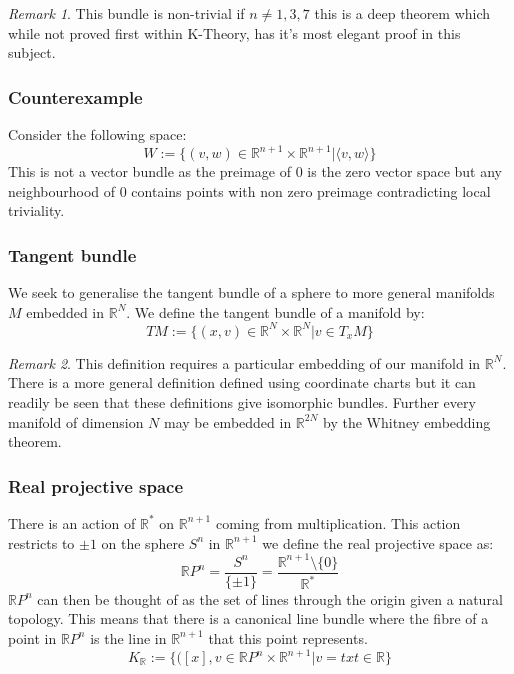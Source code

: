 \documentclass[a4paper,10pt]{article}
\theoremstyle{plain}%
\theoremstyle{definition}
\theoremstyle{remark}
\newtheorem{rem}{Remark}
\newcommand{\RR}{\mathbb{R}}
\begin{document}
\begin{rem}
 This bundle is non-trivial if $n\neq 1,3,7$ this is a deep theorem which while not proved first within 
K-Theory, has it's most elegant proof in this subject.
\end{rem}


\subsubsection{Counterexample}

Consider the following space:
$$W:=\{ (v,w) \in \RR^{n+1}\times \RR^{n+1} | \langle v,w \rangle \}$$
This is not a vector bundle as the preimage of $0$ is the zero vector space but any neighbourhood of $0$ 
contains points with non zero preimage contradicting local triviality.

\subsubsection{Tangent bundle}

We seek to generalise the tangent bundle of a sphere to more general manifolds $M$ embedded in $\RR^N$.
We define the tangent bundle of a manifold by:
$$TM:=\{ (x,v)\in \RR^N\times\RR^N | v\in T_xM \}$$

\begin{rem}
 This definition requires a particular embedding of our manifold in $\RR^N$. There is a more general definition
defined using coordinate charts but it can readily be seen that these definitions give isomorphic bundles. Further 
every manifold of dimension $N$ may be embedded in $\RR^{2N}$ by the Whitney embedding theorem. 
\end{rem}


\subsubsection{Real projective space}

There is an action of $\RR^\ast$ on $\RR^{n+1}$ coming from multiplication. This action restricts to $\pm 1$ on 
the sphere $S^n$ in $\RR^{n+1}$ we define the real projective space as:
$$\RR P^n = \frac{S^n}{\{\pm 1\}} = \frac{\RR^{n+1}\setminus\{0\}}{\RR^\ast}$$
$\RR P^n$ can then be thought of as the set of lines through the origin given a natural topology. This means 
that there is a canonical line bundle where the fibre of a point in $\RR P^n$ is the line in $\RR^{n+1}$ that this 
point represents.
$$K_\RR := \{ ([x],v\in \RR P^n\times \RR^{n+1} | v=tx t\in \RR\}$$
\end{document}
